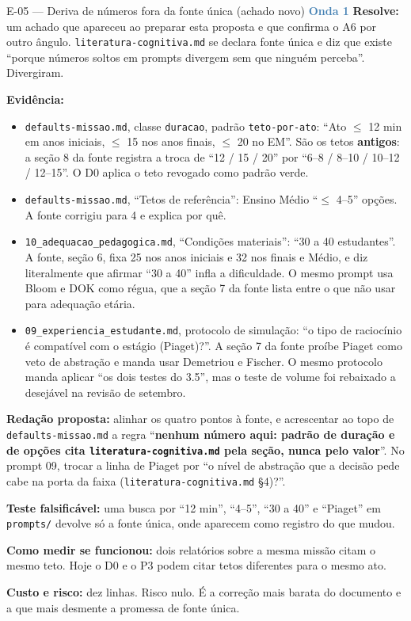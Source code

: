 \documentclass[11pt,a4paper]{article}
\newcommand{\onda}[1]{\textcolor{SteelBlue}{\textbf{Onda #1}}}
\begin{document}
\begin{emendabox}{E-05 --- Deriva de números fora da fonte única (achado novo) \hfill \onda{1}}
\textbf{Resolve:} um achado que apareceu ao preparar esta proposta e que confirma o A6 por outro
ângulo. \texttt{literatura-cognitiva.md} se declara fonte única e diz que existe ``porque números
soltos em prompts divergem sem que ninguém perceba''. Divergiram.

\textbf{Evidência:}
\begin{itemize}
  \item \texttt{defaults-missao.md}, classe \texttt{duracao}, padrão \texttt{teto-por-ato}: ``Ato
        $\le$ 12 min em anos iniciais, $\le$ 15 nos anos finais, $\le$ 20 no EM''. São os tetos
        \textbf{antigos}: a seção 8 da fonte registra a troca de ``12 / 15 / 20'' por ``6--8 /
        8--10 / 10--12 / 12--15''. O D0 aplica o teto revogado como padrão verde.
  \item \texttt{defaults-missao.md}, ``Tetos de referência'': Ensino Médio ``$\le$ 4--5'' opções.
        A fonte corrigiu para 4 e explica por quê.
  \item \texttt{10\_adequacao\_pedagogica.md}, ``Condições materiais'': ``30 a 40 estudantes''. A
        fonte, seção 6, fixa 25 nos anos iniciais e 32 nos finais e Médio, e diz literalmente que
        afirmar ``30 a 40'' infla a dificuldade. O mesmo prompt usa Bloom e DOK como régua, que a
        seção 7 da fonte lista entre o que não usar para adequação etária.
  \item \texttt{09\_experiencia\_estudante.md}, protocolo de simulação: ``o tipo de raciocínio é
        compatível com o estágio (Piaget)?''. A seção 7 da fonte proíbe Piaget como veto de
        abstração e manda usar Demetriou e Fischer. O mesmo protocolo manda aplicar ``os dois testes
        do 3.5'', mas o teste de volume foi rebaixado a desejável na revisão de setembro.
\end{itemize}

\textbf{Redação proposta:} alinhar os quatro pontos à fonte, e acrescentar ao topo de
\texttt{defaults-missao.md} a regra ``\textbf{nenhum número aqui: padrão de duração e de opções
cita \texttt{literatura-cognitiva.md} pela seção, nunca pelo valor}''. No prompt 09, trocar a
linha de Piaget por ``o nível de abstração que a decisão pede cabe na porta da faixa
(\texttt{literatura-cognitiva.md} \S4)?''.

\textbf{Teste falsificável:} uma busca por ``12 min'', ``4--5'', ``30 a 40'' e ``Piaget'' em
\texttt{prompts/} devolve só a fonte única, onde aparecem como registro do que mudou.

\textbf{Como medir se funcionou:} dois relatórios sobre a mesma missão citam o mesmo teto. Hoje o
D0 e o P3 podem citar tetos diferentes para o mesmo ato.

\textbf{Custo e risco:} dez linhas. Risco nulo. É a correção mais barata do documento e a que
mais desmente a promessa de fonte única.
\end{emendabox}
\end{document}
